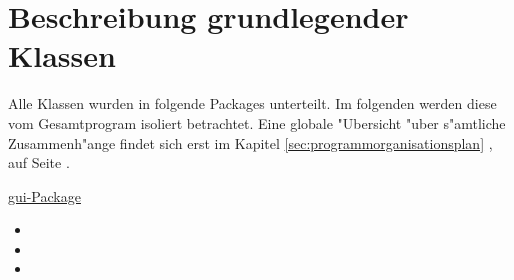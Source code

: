 \section{Beschreibung grundlegender Klassen}
Alle Klassen wurden in folgende Packages unterteilt. Im folgenden werden diese vom Gesamtprogram isoliert betrachtet. Eine globale "Ubersicht "uber s"amtliche Zusammenh"ange findet sich erst im Kapitel \ref{sec:programmorganisationsplan} , auf Seite \pageref{sec:programmorganisationsplan}. 

\bigbreak

{\large \underline{gui-Package}}
\begin{itemize}
	\item {}
	\item {}
	\item {}
\end{itemize}

\bigbreak

